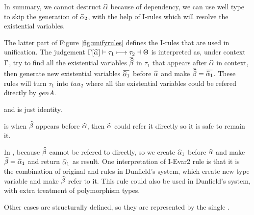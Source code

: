 In summary, we cannot destruct $\widehat{\alpha}$ because of dependency, we can use well type to skip the generation of $\widehat{\alpha}_2$, with the help of I-rules which will resolve the existential variables.

The latter part of Figure \ref{fig:unifyrules} defines the I-rules that are used in unification. The judgement $\Gamma[\widehat{\alpha}] \vdash \tau_1 \longmapsto \tau_2 \dashv \Theta$ is interpreted as, under context $\Gamma$, try to find all the existential variables $\overbar \genB$ in $\tau_1$ that appears after $\widehat{\alpha}$ in context, then generate new existential variables $\overbar {\genA_1}$ before $\widehat{\alpha}$ and make $\overbar \genB = \overbar {\genA_1}$. These rules will turn $\tau_1$ into $tau_2$ where all the existential variables could be refered directly by $genA$.

 and  is just identity.

 is when $\widehat{\beta}$ appears before $\widehat{\alpha}$, then $\widehat{\alpha}$ could refer it directly so it is safe to remain it.

In , because $\widehat{\beta}$ cannot be refered to directly, so we create $\widehat{\alpha}_1$ before $\widehat{\alpha}$ and make $\widehat{\beta}=\widehat{\alpha}_1$ and return $\widehat{\alpha}_1$ as result. One interpretation of I-Evar2 rule is that it is the combination of original  and  rules in Dunfield's system, which create new type variable and make $\widehat{\beta}$ refer to it. This rule could also be used in Dunfield's system, with extra treatment of polymorphism types.

Other cases are structurally defined, so they are represented by the single .
